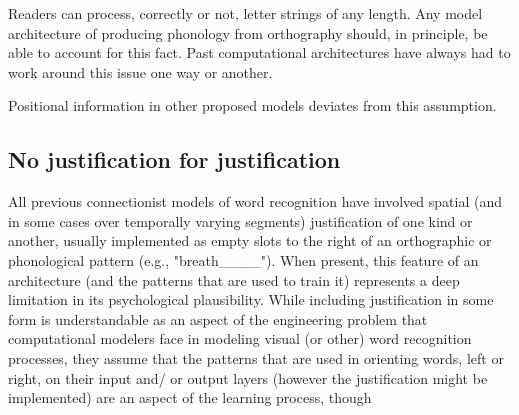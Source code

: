 \documentclass[
  american,
  ,man,floatsintext]{apa6}
\begin{document}
Readers can process, correctly or not, letter strings of any length. Any model architecture of producing phonology from orthography should, in principle, be able to account for this fact. Past computational architectures have always had to work around this issue one way or another.

Positional information in other proposed models deviates from this assumption.

\hypertarget{no-justification-for-justification}{%
\subsection{No justification for justification}\label{no-justification-for-justification}}

All previous connectionist models of word recognition have involved spatial (and in some cases over temporally varying segments) justification of one kind or another, usually implemented as empty slots to the right of an orthographic or phonological pattern (e.g., "breath\_\_\_\_"). When present, this feature of an architecture (and the patterns that are used to train it) represents a deep limitation in its psychological plausibility. While including justification in some form is understandable as an aspect of the engineering problem that computational modelers face in modeling visual (or other) word recognition processes, they assume that the patterns that are used in orienting words, left or right, on their input and/ or output layers (however the justification might be implemented) are an aspect of the learning process, though


\clearpage
\renewcommand{\listtablename}{Table captions}
\end{document}

